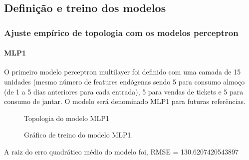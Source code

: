 \documentclass[	12pt, Times, openright, twoside, a4paper, english, brazil]{abntex2}
\begin{document}
    	\subsection{Definição e treino dos modelos}
    	    \subsubsection{Ajuste empírico de topologia com os modelos perceptron}
              \paragraph{MLP1}
    	        O primeiro modelo perceptron multilayer foi definido com uma camada de 15 unidades (mesmo número de features endógenas sendo 5 para consumo almoço (de 1 a 5 dias anteriores para cada entrada), 5 para vendas de tickets e 5 para consumo de jantar.
    	        O modelo será denominado MLP1 para futuras referências.
    	        \begin{figure}[!ht]
                	\caption{Topologia do modelo MLP1 \label{fig:case1_mlp1} }
                \end{figure}
                \begin{figure}[!ht]
                	\caption{Gráfico de treino do modelo MLP1. \label{fig:case1_mlp1_train} }
                \end{figure}
    	        A raiz do erro quadrático médio do modelo foi, RMSE = 130.6207420543897
    	        
\end{document}
